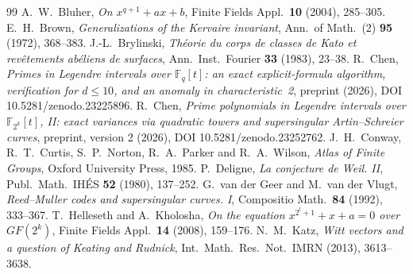 ﻿\documentclass[12pt,a4paper]{amsart}
\theoremstyle{definition}
\newcommand{\F}{\mathbb{F}}
\begin{document}
\clearpage
\begin{thebibliography}{99}
 A.~W.~Bluher, \emph{On $x^{q+1}+ax+b$}, Finite Fields Appl.\ \textbf{10} (2004), 285--305.
 E.~H.~Brown, \emph{Generalizations of the Kervaire invariant}, Ann.\ of Math.\ (2) \textbf{95} (1972), 368--383.
 J.-L.~Brylinski, \emph{Th\'eorie du corps de classes de Kato et rev\^etements ab\'eliens de surfaces}, Ann.\ Inst.\ Fourier \textbf{33} (1983), 23--38.
 R.~Chen, \emph{Primes in Legendre intervals over $\F_q[t]$: an exact explicit-formula algorithm, verification for $d\le10$, and an anomaly in characteristic~2}, preprint (2026), DOI 10.5281/zenodo.23225896.
 R.~Chen, \emph{Prime polynomials in Legendre intervals over $\F_{2^k}[t]$, II: exact variances via quadratic towers and supersingular Artin--Schreier curves}, preprint, version 2 (2026), DOI 10.5281/zenodo.23252762.
 J.~H.~Conway, R.~T.~Curtis, S.~P.~Norton, R.~A.~Parker and R.~A.~Wilson, \emph{Atlas of Finite Groups}, Oxford University Press, 1985.
 P.~Deligne, \emph{La conjecture de Weil. II}, Publ.\ Math.\ IH\'ES \textbf{52} (1980), 137--252.
 G.~van der Geer and M.~van der Vlugt, \emph{Reed--Muller codes and supersingular curves. I}, Compositio Math.\ \textbf{84} (1992), 333--367.
 T.~Helleseth and A.~Kholosha, \emph{On the equation $x^{2^l+1}+x+a=0$ over $GF(2^k)$}, Finite Fields Appl.\ \textbf{14} (2008), 159--176.
 N.~M.~Katz, \emph{Witt vectors and a question of Keating and Rudnick}, Int.\ Math.\ Res.\ Not.\ IMRN (2013), 3613--3638.
\end{thebibliography}
\end{document}
